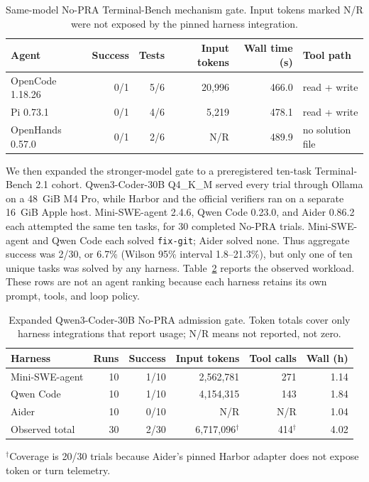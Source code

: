 \documentclass[11pt]{article}
\begin{document}
\begin{table}[H]
\centering
\small
\caption{Same-model No-PRA Terminal-Bench mechanism gate. Input tokens marked
N/R were not exposed by the pinned harness integration.}
\begin{tabular}{lrrrrl}
\toprule
Agent & Success & Tests & Input tokens & Wall time (s) & Tool path \\
\midrule
OpenCode 1.18.26 & 0/1 & 5/6 & 20,996 & 466.0 & read + write \\
Pi 0.73.1 & 0/1 & 4/6 & 5,219 & 478.1 & read + write \\
OpenHands 0.57.0 & 0/1 & 2/6 & N/R & 489.9 & no solution file \\
\bottomrule
\end{tabular}
\label{tab:coding-agent-gate}
\end{table}

We then expanded the stronger-model gate to a preregistered ten-task
Terminal-Bench 2.1 cohort. Qwen3-Coder-30B Q4\_K\_M served every trial through
Ollama on a 48~GiB M4 Pro, while Harbor and the official verifiers ran on a
separate 16~GiB Apple host. Mini-SWE-agent 2.4.6, Qwen Code 0.23.0, and Aider
0.86.2 each attempted the same ten tasks, for 30 completed No-PRA trials.
Mini-SWE-agent and Qwen Code each solved \texttt{fix-git}; Aider solved none.
Thus aggregate success was 2/30, or 6.7\% (Wilson 95\% interval
1.8--21.3\%), but only one of ten unique tasks was solved by any harness.
Table~\ref{tab:coding-agent-expanded-gate} reports the observed workload. These
rows are not an agent ranking because each harness retains its own prompt,
tools, and loop policy.

\begin{table}[H]
\centering
\small
\caption{Expanded Qwen3-Coder-30B No-PRA admission gate. Token totals cover
only harness integrations that report usage; N/R means not reported, not zero.}
\begin{tabular}{lrrrrr}
\toprule
Harness & Runs & Success & Input tokens & Tool calls & Wall (h) \\
\midrule
Mini-SWE-agent & 10 & 1/10 & 2,562,781 & 271 & 1.14 \\
Qwen Code & 10 & 1/10 & 4,154,315 & 143 & 1.84 \\
Aider & 10 & 0/10 & N/R & N/R & 1.04 \\
\midrule
Observed total & 30 & 2/30 & 6,717,096$^{\dagger}$ & 414$^{\dagger}$ & 4.02 \\
\bottomrule
\end{tabular}
\par\vspace{2pt}\footnotesize $^{\dagger}$Coverage is 20/30 trials because
Aider's pinned Harbor adapter does not expose token or turn telemetry.
\label{tab:coding-agent-expanded-gate}
\end{table}
\end{document}
